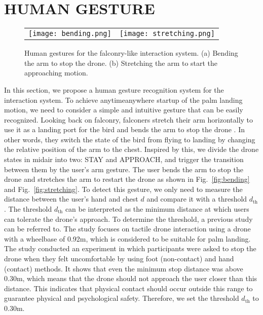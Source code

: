 \section{HUMAN GESTURE}
\label{sec:gesture}


\begin{figure}[!b]
  \centering
  \begin{tabular}{cc}
      \begin{minipage}[t]{0.34 \columnwidth}
        \centering
        \texttt{[image: bending.png]}
        \subcaption{}
        \label{fig:bending}
      \end{minipage} &
      \begin{minipage}[t]{0.48 \columnwidth}
        \centering
        \texttt{[image: stretching.png]}
        \subcaption{}
        \label{fig:stretching}
      \end{minipage}
    \end{tabular}
  \caption{Human gestures for the falconry-like interaction system. (a) Bending the arm to stop the drone. (b) Stretching the arm to start the approaching motion.}
  \label{fig:gesture}
\end{figure}


In this section, we propose a human gesture recognition system for the interaction system.
To achieve anytime{\-}anywhere startup of the palm landing motion, we need to consider a simple and intuitive gesture that can be easily recognized.
Looking back on falconry, falconers stretch their arm horizontally to use it as a landing port for the bird and bends the arm to stop the drone .
In other words, they switch the state of the bird from flying to landing by changing the relative position of the arm to the chest.
Inspired by this, we divide the drone states in midair into two: STAY and APPROACH,
and trigger the transition between them by the user's arm gesture.
The user bends the arm to stop the drone and stretches the arm to restart the drone as shown in Fig.~\ref{fig:bending} and Fig.~\ref{fig:stretching}.
To detect this gesture, we only need to measure the distance between the user's hand and chest $d$ and compare it with a threshold $d_{\text{th}}$.
The threshold $d_{\text{th}}$ can be interpreted as the minimum distance at which users can tolerate the drone's approach.
To determine the threshold, a previous study \cite{lieser2021evaluating-distances} can be referred to.
The study focuses on tactile drone interaction using a drone with a wheelbase of 0.92m, which is considered to be suitable for palm landing.
The study conducted an experiment in which participants were asked to stop the drone when they felt uncomfortable by using foot (non-contact) and hand (contact) methods.
It shows that even the minimum stop distance was above 0.30m, 
which means that the drone should not approach the user closer than this distance.
This indicates that physical contact should occur outside this range to guarantee physical and psychological safety.
Therefore, we set the threshold $d_{\text{th}}$ to 0.30m.
